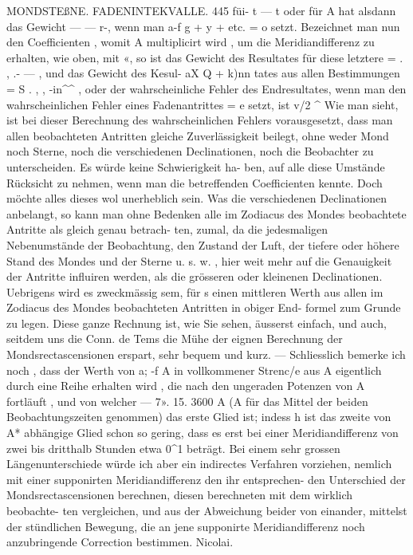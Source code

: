 \documentclass[10pt,a4paper]{article}
\begin{document}
MONDSTEßNE.     FADENINTEKVALLE.  445
füi-   t  ---  t    oder  für   A   hat  alsdann  das  Gewicht  --- --- r-,  wenn  man  a-f  g  +  y  +  etc.  =  o  setzt.    Bezeichnet
man  nun  den  Coefficienten ,  womit  A  multiplicirt  wird ,  um  die  Meridiandifferenz  zu  erhalten,  wie  oben,
mit  «,   so  ist  das  Gewicht  des  Resultates  für  diese  letztere    =  .    ,  .- --- ,    und  das  Gewicht  des  Kesul-
aX  Q  +  k)nn
tates  aus  allen  Bestimmungen    =  S .  ,     ,  -in\textasciicircum{}\textasciicircum{}  ,  oder  der  wahrscheinliche  Fehler  des  Endresultates,  wenn
man  den  wahrscheinlichen  Fehler  eines  Fadenantrittes    =  e    setzt,  ist
v/2       \glqq{}\textasciicircum{}
Wie  man  sieht,  ist  bei  dieser  Berechnung  des  wahrscheinlichen  Fehlers  vorausgesetzt,  dass  man
allen  beobachteten  Antritten  gleiche  Zuverlässigkeit  beilegt,  ohne  weder  Mond  noch  Sterne,  noch  die
verschiedenen  Declinationen,  noch  die  Beobachter  zu  unterscheiden.  Es  würde  keine  Schwierigkeit  ha-
ben, auf  alle  diese  Umstände  Rücksicht  zu  nehmen,  wenn  man  die  betreffenden  Coefficienten  kennte.
Doch  möchte  alles  dieses  wol  unerheblich  sein.  Was  die  verschiedenen  Declinationen  anbelangt,  so
kann  man  ohne  Bedenken  alle  im  Zodiacus  des  Mondes  beobachtete  Antritte  als  gleich  genau  betrach-
ten, zumal,  da  die  jedesmaligen  Nebenumstände  der  Beobachtung,  den  Zustand  der  Luft,  der  tiefere
oder  höhere  Stand  des  Mondes  und  der  Sterne  u.  s.  w. ,  hier  weit  mehr  auf  die  Genauigkeit  der  Antritte
influiren  werden,  als  die  grösseren  oder  kleinenen  Declinationen.  Uebrigens  wird  es  zweckmässig  sem,
für  s  einen  mittleren  Werth  aus  allen  im  Zodiacus  des  Mondes  beobachteten  Antritten  in  obiger  End-
formel zum  Grunde  zu  legen.
Diese  ganze  Rechnung  ist,  wie  Sie  sehen,  äusserst  einfach,  und  auch,  seitdem  uns  die  Conn.  de
Tems  die  Mühe  der  eignen  Berechnung  der  Mondsrectascensionen  erspart,  sehr  bequem  und  kurz.  ---
Schliesslich  bemerke  ich  noch ,  dass  der  Werth  von  a;  -f  A  in  vollkommener  Strenc/e  aus  A  eigentlich
durch  eine  Reihe  erhalten  wird ,   die  nach  den  ungeraden  Potenzen  von    A    fortläuft ,   und  von  welcher
---  7».  15. 3600  A   (A  für  das  Mittel  der  beiden  Beobachtungszeiten  genommen)  das  erste  Glied  ist;    indess
h
ist  das  zweite  von    A*    abhängige  Glied  schon   so   gering,   dass  es   erst  bei  einer  Meridiandifferenz  von
zwei  bis  dritthalb  Stunden  etwa  0\textasciicircum{}1  beträgt.  Bei  einem  sehr  grossen  Längenunterschiede  würde  ich  aber
ein  indirectes  Verfahren  vorziehen,  nemlich  mit  einer  supponirten  Meridiandifferenz  den  ihr  entsprechen-
den Unterschied  der  Mondsrectascensionen  berechnen,  diesen  berechneten  mit  dem  wirklich  beobachte-
ten vergleichen,  und  aus  der  Abweichung  beider  von  einander,  mittelst  der  stündlichen  Bewegung,  die
an  jene  supponirte  Meridiandifferenz  noch  anzubringende  Correction  bestimmen.
Nicolai.
\end{document}
